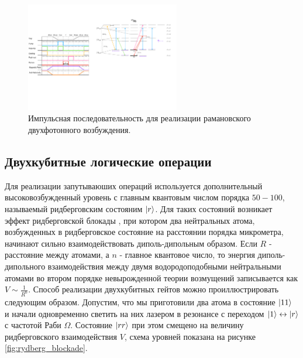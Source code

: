 \begin{figure}[H]
	\centering
	\includegraphics[width=0.6\textwidth]{images/pulse_scheme_raman.pdf}
	\caption{Импульсная последовательность для реализации рамановского двухфотонного возбуждения.}
	\label{fig:pulse_scheme_raman}
\end{figure}

\subsection{Двухкубитные логические операции}

Для реализации запутываюших операций используется дополнительный высоковозбужденный уровень с главным квантовым числом порядка $50-100$, называемый ридберговским состояним $\left| r \right\rangle$. Для таких состояний возникает эффект ридберговской блокады \cite{PhysRevLett.85.2208}, при котором два нейтральных атома, возбужденных в ридберговское состояние на расстоянии порядка микрометра, начинают сильно взаимодействовать диполь-дипольным образом. Если $R$ - расстояние между атомами, а $n$ - главное квантовое число, то энергия диполь-дипольного взаимодействия между двумя водородоподобными нейтральными атомами во втором порядке невырожденной теории возмущений записывается как $V\sim \frac{1}{R^{6}}$. Способ реализации двухкубитных гейтов можно проиллюстрировать следующим образом. Допустим, что мы приготовили два атома в состояние $\left| 11 \right\rangle$ и начали одновременно светить на них лазером в резонансе с переходом $\left| 1 \right\rangle\leftrightarrow\left| r \right\rangle$ с частотой Раби $\Omega$. Состояние $\left| rr \right\rangle$ при этом смещено на величину ридберговского взаимодействия $V$, схема уровней показана на рисунке \ref{fig:rydberg_blockade}.

